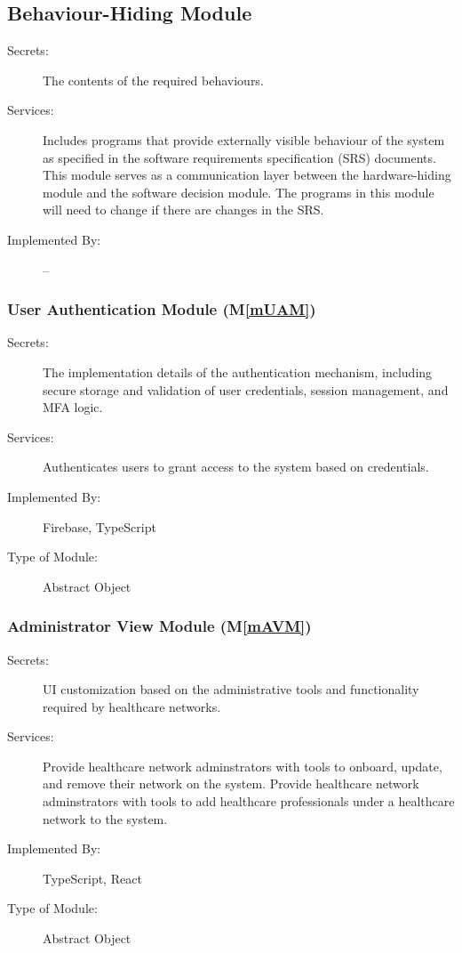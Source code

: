 \documentclass[12pt, titlepage]{article}
\newcommand{\mref}[1]{M\ref{#1}}
\begin{document}
\subsection{Behaviour-Hiding Module}

\begin{description}
\item[Secrets:]The contents of the required behaviours.
\item[Services:]Includes programs that provide externally visible behaviour of the system as specified in the software requirements specification (SRS) documents. This module serves as a communication layer between the hardware-hiding module and the software decision module. The programs in this module will need to change if there are changes in the SRS.
\item[Implemented By:] --
\end{description}

\subsubsection{User Authentication Module (\mref{mUAM})} 

\begin{description}
\item[Secrets:]The implementation details of the authentication mechanism, including secure storage and validation of user credentials, session management, and MFA logic.
\item[Services:]Authenticates users to grant access to the system based on credentials.
\item[Implemented By:]Firebase, TypeScript
\item[Type of Module:]Abstract Object
\end{description}

\subsubsection{Administrator View Module (\mref{mAVM})}

\begin{description}
\item[Secrets:]UI customization based on the administrative tools and functionality required by healthcare networks.
\item[Services:]Provide healthcare network adminstrators with tools to onboard, update, and remove their network on the system. Provide healthcare network adminstrators with tools to add healthcare professionals under a healthcare network to the system.
\item[Implemented By:]TypeScript, React
\item[Type of Module:]Abstract Object
\end{description}
\end{document}
